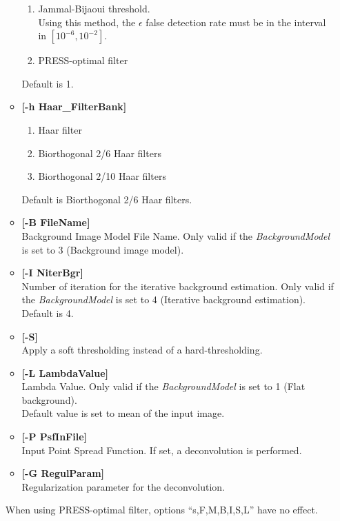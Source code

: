 \begin{itemize}
\begin{itemize}
\begin{enumerate}
\item Jammal-Bijaoui threshold. \\
Using this method, the $\epsilon$ false detection rate must be in 
the interval in $[10^{-6},10^{-2}]$.
\item PRESS-optimal filter
\end{enumerate}
Default is 1.
\item {\bf [-h Haar\_FilterBank]} 
\begin{enumerate}
\item Haar filter 
\item Biorthogonal 2/6 Haar filters 
\item Biorthogonal 2/10 Haar filters 
\end{enumerate}
Default is Biorthogonal 2/6 Haar filters.
\item {\bf [-B FileName]} \\
Background Image Model File Name. Only valid if the
{\em BackgroundModel} is set to 3 (Background image model).
\item {\bf [-I NiterBgr]} \\
 Number of iteration for the iterative background estimation. Only valid if the
{\em BackgroundModel} is set to 4 (Iterative background estimation). \\
Default is 4.
\item {\bf [-S]} \\
Apply a soft thresholding instead of a hard-thresholding.
\item {\bf [-L LambdaValue]} \\
Lambda Value. Only valid if the
{\em BackgroundModel} is set to 1 (Flat background). \\
Default value is set to mean of the input image.
\item {\bf [-P PsfInFile]} \\
Input Point Spread Function.
If set, a deconvolution is performed.
\item {\bf [-G RegulParam]} \\
Regularization parameter for the deconvolution.
\end{itemize}
When using PRESS-optimal filter, options ``s,F,M,B,I,S,L'' have no effect.



\end{itemize}
